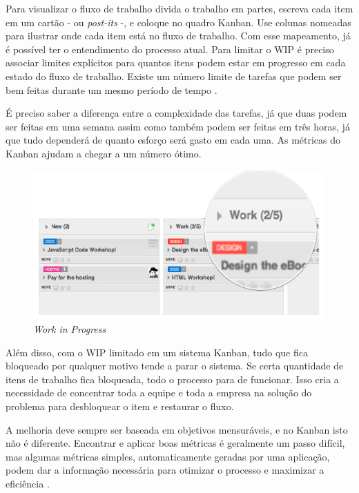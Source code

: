Para visualizar o fluxo de trabalho divida o trabalho em partes, escreva cada item em um cartão - ou \textit{post-its} -, e coloque no quadro Kanban. Use colunas nomeadas para ilustrar onde cada item está no fluxo de trabalho. Com esse mapeamento, já é possível ter o entendimento do processo atual. 
Para limitar o WIP é preciso associar limites explícitos para quantos itens podem estar em progresso em cada estado do fluxo de trabalho. Existe um número limite de tarefas que podem ser bem feitas durante um mesmo período de tempo \cite{klipp}. 

É preciso saber a diferença entre a complexidade das tarefas, já que duas podem ser feitas em uma semana assim como também podem ser feitas em três horas, já que tudo dependerá de quanto esforço será gasto em cada uma. As métricas do Kanban ajudam a chegar a um número ótimo.

\begin{figure}[H]
		\centering
		\label{fig05}
			\includegraphics[scale=0.5]{figuras/WIP.png}
		\caption{\textit{Work in Progress}  \cite{klipp}}
\end{figure}


Além disso, com o WIP limitado em um sistema Kanban, tudo que fica bloqueado por qualquer motivo tende a parar o sistema. Se certa quantidade de itens de trabalho fica bloqueada, todo o processo para de funcionar. Isso cria a necessidade de concentrar toda a equipe e toda a empresa na solução do problema para desbloquear o item e restaurar o fluxo. 

A melhoria deve sempre ser baseada em objetivos mensuráveis, e no Kanban isto não é diferente. Encontrar e aplicar boas métricas é geralmente um passo difícil, mas algumas métricas simples, automaticamente geradas por uma aplicação, podem dar a informação necessária para otimizar o processo e maximizar a eficiência \cite{klipp}. 

